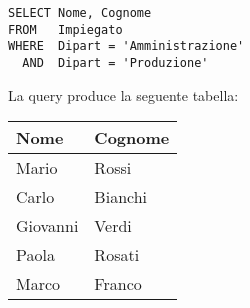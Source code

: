 \begin{lstlisting}
SELECT Nome, Cognome
FROM   Impiegato
WHERE  Dipart = 'Amministrazione'
  AND  Dipart = 'Produzione'
\end{lstlisting}

La query produce la seguente tabella:

\begin{center}
	\begin{tabular}{@{} l l @{}}
		\toprule
			Nome		& Cognome \\
		\midrule
			Mario		& Rossi \\
			Carlo		& Bianchi \\
			Giovanni	& Verdi \\
			Paola		& Rosati \\
			Marco		& Franco \\
		\bottomrule
	\end{tabular}
\end{center}
